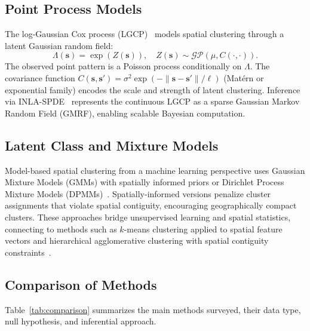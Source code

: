 \documentclass[conference]{IEEEtran}
\theoremstyle{definition}
\begin{document}
\subsection{Point Process Models}

The log-Gaussian Cox process (LGCP)~\cite{moller1998} models spatial clustering through a latent Gaussian random field:
\begin{equation}
\Lambda(\mathbf{s}) = \exp(Z(\mathbf{s})), \quad Z(\mathbf{s}) \sim \mathcal{GP}(\mu, C(\cdot, \cdot)).
\end{equation}
The observed point pattern is a Poisson process conditionally on $\Lambda$. The covariance function $C(\mathbf{s}, \mathbf{s}') = \sigma^2 \exp(-\|\mathbf{s}-\mathbf{s}'\|/\ell)$ (Mat\'{e}rn or exponential family) encodes the scale and strength of latent clustering. Inference via INLA-SPDE~\cite{lindgren2011} represents the continuous LGCP as a sparse Gaussian Markov Random Field (GMRF), enabling scalable Bayesian computation.

\subsection{Latent Class and Mixture Models}

Model-based spatial clustering from a machine learning perspective uses Gaussian Mixture Models (GMMs) with spatially informed priors or Dirichlet Process Mixture Models (DPMMs)~\cite{gelfand2005}. Spatially-informed versions penalize cluster assignments that violate spatial contiguity, encouraging geographically compact clusters. These approaches bridge unsupervised learning and spatial statistics, connecting to methods such as $k$-means clustering applied to spatial feature vectors and hierarchical agglomerative clustering with spatial contiguity constraints~\cite{chavent2018}.

\subsection{Comparison of Methods}

Table~\ref{tab:comparison} summarizes the main methods surveyed, their data type, null hypothesis, and inferential approach.
\end{document}
